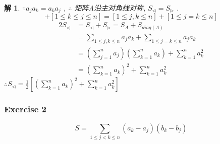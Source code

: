 \documentclass[mode=geye]{elegantnote}
\newtheorem{solve}{解}
\begin{document}
\begin{solve}
    $ \because a_j a_k = a_k a_j $ , $ \therefore  $ 矩阵A沿主对角线对称, $ S_{\triangleleft} = S_{\triangleright} $ .
    \begin{equation*}
        [1\leqslant j \leqslant k \leqslant n] + [1\leqslant k \leqslant j \leqslant n] =[1\leqslant j , k \leqslant n] + [1\leqslant j = k \leqslant n]
    \end{equation*}
    \begin{align*}
        2S_{\triangleleft} &= S_{\triangleleft}+S_{\triangleright} = S_{A}+S_{diag(A)} \\
        &= \sum_{1\leqslant j , k \leqslant n} a_j a_k + \sum_{1\leqslant j = k \leqslant n} a_j a_k\\
        &= \left(\sum_{j=1}^{n} a_j\right)\left(\sum_{k=1}^{n} a_k\right) + \sum_{k=1}^{n} a_k^2\\
        &= \left(\sum_{k=1}^{n} a_k\right)^2 + \sum_{k=1}^{n} a_k^2
    \end{align*}
    $ \therefore S_{\triangleleft} = \frac{1}{2}[\left(\sum_{k=1}^{n} a_k\right)^2 + \sum_{k=1}^{n} a_k^2] $ 
\end{solve}

\subsubsection{Exercise 2}

\begin{equation}
    S = \sum_{1\leqslant j < k \leqslant n} (a_k-a_j)(b_k-b_j)
\end{equation}
\end{document}
